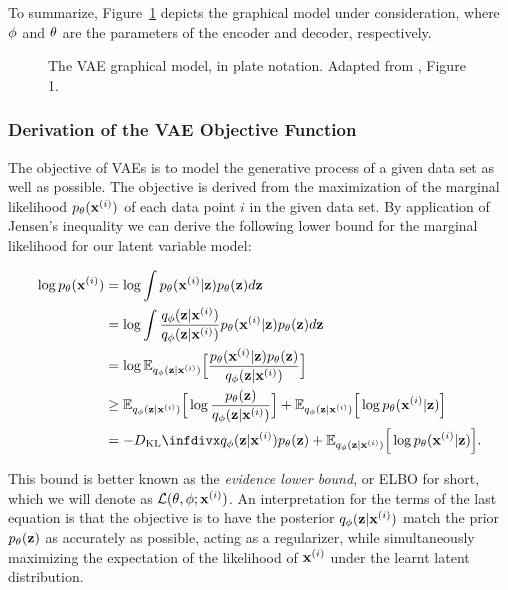 To summarize, Figure~\ref{fig:aevb_plate_notation} depicts the graphical model under consideration, where $\mathbf{\phi}$ and $\mathbf{\theta}$ are the parameters of the encoder and decoder, respectively.

\begin{figure}[!htb]
  \centering
  \resizebox{0.3\textwidth}{!}{\unskip}
  \caption{The VAE graphical model, in plate notation. Adapted from \cite{aevb}, Figure 1.}
  \label{fig:aevb_plate_notation}
\end{figure}

\subsubsection{Derivation of the VAE Objective Function}


The objective of VAEs is to model the generative process of a given data set as well as possible. The objective is derived from the maximization of the marginal likelihood $p_{\mathbf{\theta}}(\mathbf{x}^{(i)})$ of each data point $i$ in the given data set. By application of Jensen's inequality we can derive the following lower bound for the marginal likelihood for our latent variable model:

\begin{equation}
\begin{aligned}
\log \ptheta(\bxi) & = \log \int \ptheta(\bxi \vert \bz) \ptheta(\bz) d\bz \\
                   & = \log \int \frac{\qphi(\bz \vert \bxi)}{\qphi(\bz \vert \bxi)} \ptheta(\bxi \vert \bz) \ptheta(\bz) d\bz \\
                   & = \log \mathbb{E}_{\qphi(\bz \vert \bxi)}\Big[\frac{\ptheta(\bxi \vert \bz) \ptheta(\bz)}{\qphi(\bz \vert \bxi)}\Big] \\
                   & \geq \mathbb{E}_{\qphi(\bz \vert \bxi)}\Big[\log \frac{\ptheta(\bz)}{\qphi(\bz \vert \bxi)}\Big] + \mathbb{E}_{\qphi(\bz \vert \bxi)}\Big[\log \ptheta(\bxi \vert \bz)\Big] \\
                   & = -\dkl{\qphi(\bz \vert \bxi)}{\ptheta(\bz)} + \mathbb{E}_{\qphi(\bz \vert \bxi)}\Big[\log \ptheta(\bxi \vert \bz)\Big].
\end{aligned}
\end{equation}

This bound is better known as the \textit{evidence lower bound}, or ELBO for short, which we will denote as $\mathcal{L}(\mathbf{\theta}, \mathbf{\phi}; \mathbf{x}^{(i)})$. An interpretation for the terms of the last equation is that the objective is to have the posterior $q_{\mathbf{\phi}}(\mathbf{z} \vert \mathbf{x}^{(i)})$ match the prior $p_{\mathbf{\theta}}(\mathbf{z})$ as accurately as possible, acting as a regularizer, while simultaneously maximizing the expectation of the likelihood of $\mathbf{x}^{(i)}$ under the learnt latent distribution. 

